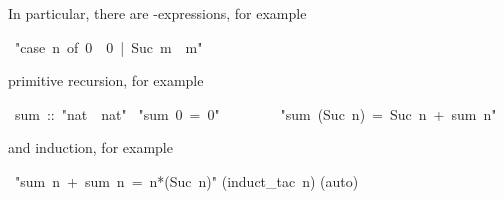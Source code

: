 \begin{isabelle}%
%
\begin{isamarkuptext}%
\noindent
In particular, there are -expressions, for example%
\end{isamarkuptext}%
~{"}case~n~of~0~{\isasymRightarrow}~0~|~Suc~m~{\isasymRightarrow}~m{"}%
\begin{isamarkuptext}%
\noindent
primitive recursion, for example%
\end{isamarkuptext}%
~sum~::~{"}nat~{\isasymRightarrow}~nat{"}\isanewline
{}~{"}sum~0~=~0{"}\isanewline
~~~~~~~~{"}sum~(Suc~n)~=~Suc~n~+~sum~n{"}%
\begin{isamarkuptext}%
\noindent
and induction, for example%
\end{isamarkuptext}%
~{"}sum~n~+~sum~n~=~n*(Suc~n){"}\isanewline
{}(induct\_tac~n)\isanewline
{}(auto)\isanewline
\end{isabelle}%
